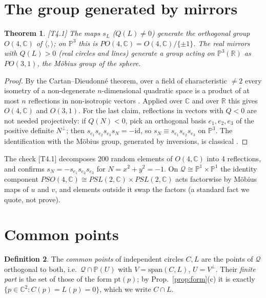 \documentclass[11pt]{article}
\newtheorem{theorem}{Theorem}[section]\newtheorem{proposition}[theorem]{Proposition}
\theoremstyle{definition}\newtheorem{definition}[theorem]{Definition}\newtheorem{remark}[theorem]{Remark}\newtheorem{example}[theorem]{Example}
\newcommand{\C}{\mathbb{C}}\newcommand{\R}{\mathbb{R}}\newcommand{\PP}{\mathbb{P}}
\newcommand{\ip}[2]{\langle #1,#2\rangle}\newcommand{\pt}{\mathrm{pt}}\newcommand{\Qd}{\mathcal{Q}}
\newcommand{\chk}[1]{\hfill{\footnotesize\textsf{[#1]}}}
\begin{document}
\section{The group generated by mirrors}\label{sec:group}
\begin{theorem}\label{thm:group}\chk{T4.1}
The maps $s_L$ ($Q(L)\ne0$) generate the orthogonal group $O(4,\C)$ of $\ip{}{}$; on $\PP^3$ this is $PO(4,\C)=O(4,\C)/\{\pm1\}$. The real mirrors with $Q(L)>0$ (real circles and lines) generate a group acting on $\PP^3(\R)$ as $PO(3,1)$, the Möbius group of the sphere.
\end{theorem}
\begin{proof}
By the Cartan--Dieudonné theorem, over a field of characteristic $\ne2$ every isometry of a non-degenerate $n$-dimensional quadratic space is a product of at most $n$ reflections in non-isotropic vectors \cite{Art57}. Applied over $\C$ and over $\R$ this gives $O(4,\C)$ and $O(3,1)$. For the last claim, reflections in vectors with $Q<0$ are not needed projectively: if $Q(N)<0$, pick an orthogonal basis $e_1,e_2,e_3$ of the positive definite $N^\perp$; then $s_{e_1}s_{e_2}s_{e_3}s_N=-\mathrm{id}$, so $s_N\equiv s_{e_1}s_{e_2}s_{e_3}$ on $\PP^3$. The identification with the Möbius group, generated by inversions, is classical \cite{Sch79}.
\end{proof}
\noindent The check \textsf{[T4.1]} decomposes 200 random elements of $O(4,\C)$ into 4 reflections, and confirms $s_N=-s_{e_1}s_{e_2}s_{e_3}$ for $N=x^2+y^2=-1$. On $\Qd\cong\PP^1\times\PP^1$ the identity component $PSO(4,\C)\cong PSL(2,\C)\times PSL(2,\C)$ acts factorwise by Möbius maps of $u$ and $v$, and elements outside it swap the factors (a standard fact we quote, not prove).

\section{Common points}\label{sec:common}
\begin{definition}
The \emph{common points} of independent circles $C,L$ are the points of $\Qd$ orthogonal to both, i.e.\ $\Qd\cap\PP(U)$ with $V=\mathrm{span}(C,L)$, $U=V^\perp$. Their \emph{finite part} is the set of those of the form $\pt(p)$; by Prop.~\ref{prop:form}(c) it is exactly $\{p\in\C^2:C(p)=L(p)=0\}$, which we write $C\cap L$.
\end{definition}
\end{document}
